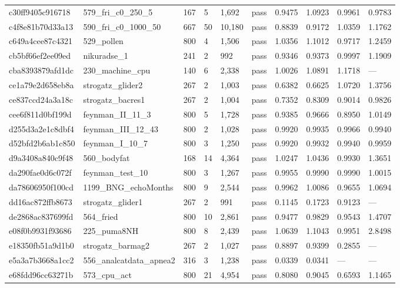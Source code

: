 \begin{longtable}{llllllllll}
c30ff9405c916718 & 579\_fri\_c0\_250\_5 & 167 & 5 & 1,692 & pass & 0.9475 & 1.0923 & 0.9961 & 0.9783\\
c4f8e81b70d33a13 & 590\_fri\_c0\_1000\_50 & 667 & 50 & 10,180 & pass & 0.8839 & 0.9172 & 1.0359 & 1.1762\\
c649a4cee87c4321 & 529\_pollen & 800 & 4 & 1,506 & pass & 1.0356 & 1.1012 & 0.9717 & 1.2459\\
cb5bf66ef2ee09ed & nikuradse\_1 & 241 & 2 & 992 & pass & 0.9346 & 0.9373 & 0.9997 & 1.1909\\
cba8393879afd1dc & 230\_machine\_cpu & 140 & 6 & 2,338 & pass & 1.0026 & 1.0891 & 1.1718 & ---\\
ce1a79e2d658eb8a & strogatz\_glider2 & 267 & 2 & 1,003 & pass & 0.6382 & 0.6625 & 1.0720 & 1.3756\\
ce837ccd24a3a18c & strogatz\_bacres1 & 267 & 2 & 1,004 & pass & 0.7352 & 0.8309 & 0.9014 & 0.9826\\
cee6f811d0bf199d & feynman\_II\_11\_3 & 800 & 5 & 1,728 & pass & 0.9385 & 0.9666 & 0.8950 & 1.0149\\
d255d3a2e1c8dbf4 & feynman\_III\_12\_43 & 800 & 2 & 1,028 & pass & 0.9920 & 0.9935 & 0.9966 & 0.9940\\
d52bfd2b6ab1c850 & feynman\_I\_10\_7 & 800 & 3 & 1,250 & pass & 0.9920 & 0.9932 & 0.9940 & 0.9959\\
d9a3408a840c9f48 & 560\_bodyfat & 168 & 14 & 4,364 & pass & 1.0247 & 1.0436 & 0.9930 & 1.3651\\
da290fae0d6c072f & feynman\_test\_10 & 800 & 3 & 1,267 & pass & 0.9955 & 0.9990 & 0.9990 & 1.0015\\
da78606950f100cd & 1199\_BNG\_echoMonths & 800 & 9 & 2,544 & pass & 0.9962 & 1.0086 & 0.9655 & 1.0694\\
dd16ac872ffb8673 & strogatz\_glider1 & 267 & 2 & 991 & pass & 0.1145 & 0.1723 & 0.9123 & ---\\
de2868ac837699fd & 564\_fried & 800 & 10 & 2,861 & pass & 0.9477 & 0.9829 & 0.9543 & 1.4707\\
e08f0b9931f93686 & 225\_puma8NH & 800 & 8 & 2,439 & pass & 1.0639 & 1.1043 & 0.9951 & 2.8498\\
e18350fb51a9d1b0 & strogatz\_barmag2 & 267 & 2 & 1,027 & pass & 0.8897 & 0.9399 & 0.2855 & ---\\
e5a3a7b3668a1cc2 & 556\_analcatdata\_apnea2 & 316 & 3 & 1,238 & pass & 0.0339 & 0.0341 & --- & ---\\
e68fdd96cc63271b & 573\_cpu\_act & 800 & 21 & 4,954 & pass & 0.8080 & 0.9045 & 0.6593 & 1.1465\\

\end{longtable}

